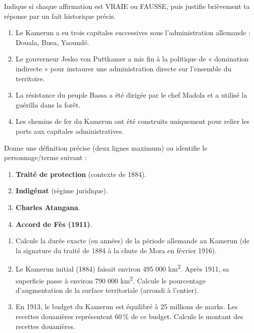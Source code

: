 \documentclass[11pt]{article}
\begin{document}
\begin{exercice}
Indique si chaque affirmation est VRAIE ou FAUSSE, puis justifie brièvement ta réponse par un fait historique précis.
\begin{enumerate}
    \item Le Kamerun a eu trois capitales successives sous l'administration allemande : Douala, Buea, Yaoundé.
    \item Le gouverneur Jesko von Puttkamer a mis fin à la politique de « domination indirecte » pour instaurer une administration directe sur l'ensemble du territoire.
    \item La résistance du peuple Bassa a été dirigée par le chef Madola et a utilisé la guérilla dans la forêt.
    \item Les chemins de fer du Kamerun ont été construits uniquement pour relier les ports aux capitales administratives.
\end{enumerate}
\end{exercice}

\begin{exercice}
Donne une définition précise (deux lignes maximum) ou identifie le personnage/terme suivant :
\begin{enumerate}
    \item \textbf{Traité de protection} (contexte de 1884).
    \item \textbf{Indigénat} (régime juridique).
    \item \textbf{Charles Atangana}.
    \item \textbf{Accord de Fès (1911)}.
\end{enumerate}
\end{exercice}

\begin{exercice}
\begin{enumerate}
    \item Calcule la durée exacte (en années) de la période allemande au Kamerun (de la signature du traité de 1884 à la chute de Mora en février 1916).
    \item Le Kamerun initial (1884) faisait environ 495 000 km\textsuperscript{2}. Après 1911, sa superficie passe à environ 790 000 km\textsuperscript{2}. Calcule le pourcentage d'augmentation de la surface territoriale (arrondi à l'entier).
    \item En 1913, le budget du Kamerun est équilibré à 25 millions de marks. Les recettes douanières représentent 60\,\% de ce budget. Calcule le montant des recettes douanières.
\end{enumerate}
\end{exercice}
\end{document}
